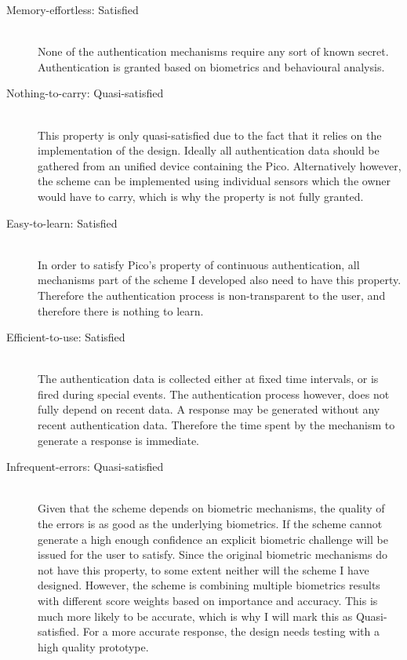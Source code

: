 \begin{description}
  \item[Memory-effortless: Satisfied] \hfill \\
  None of the authentication mechanisms require any sort of known secret. Authentication is granted based on biometrics and behavioural analysis.
  
  \item[Nothing-to-carry: Quasi-satisfied] \hfill \\
  This property is only quasi-satisfied due to the fact that it relies on the implementation of the design. Ideally all authentication data should be gathered from an unified device containing the Pico. Alternatively however, the scheme can be implemented using individual sensors which the owner would have to carry, which is why the property is not fully granted.
  
  \item[Easy-to-learn: Satisfied] \hfill \\
  In order to satisfy Pico's property of continuous authentication, all mechanisms part of the scheme I developed also need to have this property. Therefore the authentication process is non-transparent to the user, and therefore there is nothing to learn.
  
  \item[Efficient-to-use: Satisfied] \hfill \\
  The authentication data is collected either at fixed time intervals, or is fired during special events. The authentication process however, does not fully depend on recent data. A response may be generated without any recent authentication data. Therefore the time spent by the mechanism to generate a response is immediate.
  
  \item[Infrequent-errors: Quasi-satisfied] \hfill \\
  Given that the scheme depends on biometric mechanisms, the quality of the errors is as good as the underlying biometrics. If the scheme cannot generate a high enough confidence an explicit biometric challenge will be issued for the user to satisfy. Since the original biometric mechanisms do not have this property, to some extent neither will the scheme I have designed. However, the scheme is combining multiple biometrics results with different score weights based on importance and accuracy. This is much more likely to be accurate, which is why I will mark this as Quasi-satisfied. For a more accurate response, the design needs testing with a high quality prototype. 
  

\end{description}
